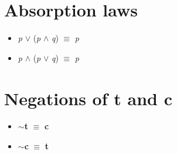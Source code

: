 \documentclass{article}
\begin{document}
\section{Absorption laws}
\begin{itemize}
\item \textit{p} $\lor$ (\textit{p} $\wedge$ \textit{q}) $\equiv$ \textit{p}
\item \textit{p} $\wedge$ (\textit{p} $\lor$ \textit{q}) $\equiv$ \textit{p}
\end{itemize}

\section{Negations of t and c}
\begin{itemize}
\item $\sim$\textbf{t} $\equiv$ \textbf{c}
\item $\sim$\textbf{c} $\equiv$ \textbf{t}
\end{itemize}
\end{document}
